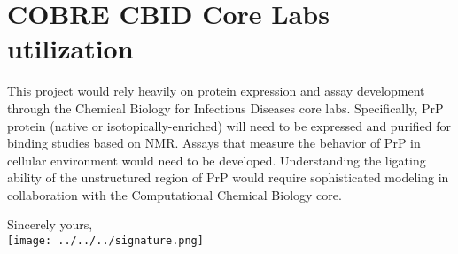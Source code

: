 \documentclass{letter}
\begin{document}
\begin{letter}{}
\section{COBRE CBID Core Labs utilization}
This project would rely heavily on protein expression and assay development through the Chemical Biology for Infectious Diseases core labs. Specifically, PrP protein (native or isotopically-enriched) will need to be expressed and purified for binding studies based on NMR. Assays that measure the behavior of PrP in cellular environment would need to be developed. Understanding the ligating ability of the unstructured region of PrP would require sophisticated modeling in collaboration with the Computational Chemical Biology core. \\

\closing{Sincerely yours,\\
\texttt{[image: ../../../signature.png]}}

\end{letter}
\end{document}
